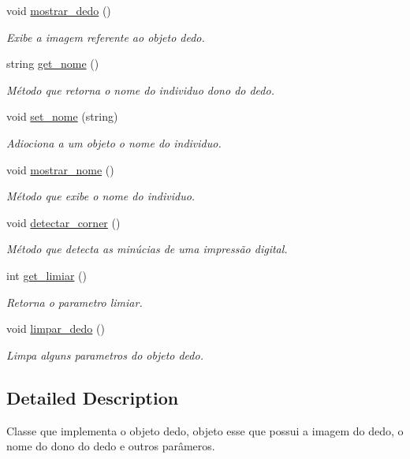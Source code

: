 \begin{DoxyCompactItemize}
void \mbox{\hyperlink{classdedo_acadef8b9556703a74d277907c119b265}{mostrar\+\_\+dedo}} ()
\begin{DoxyCompactList}\small\item\em Exibe a imagem referente ao objeto dedo. \end{DoxyCompactList}\item 
string \mbox{\hyperlink{classdedo_a3703ecb795fd327b28d9fda72de3a702}{get\+\_\+nome}} ()
\begin{DoxyCompactList}\small\item\em Método que retorna o nome do individuo dono do dedo. \end{DoxyCompactList}\item 
void \mbox{\hyperlink{classdedo_a40f9f9b467d878f95691665d8c18d005}{set\+\_\+nome}} (string)
\begin{DoxyCompactList}\small\item\em Adiociona a um objeto o nome do individuo. \end{DoxyCompactList}\item 
void \mbox{\hyperlink{classdedo_a098e4c93dfd50b699abac9a415327f2a}{mostrar\+\_\+nome}} ()
\begin{DoxyCompactList}\small\item\em Método que exibe o nome do individuo. \end{DoxyCompactList}\item 
void \mbox{\hyperlink{classdedo_a4418d126f687ab73c41bb3768f6c0d34}{detectar\+\_\+corner}} ()
\begin{DoxyCompactList}\small\item\em Método que detecta as minúcias de uma impressão digital. \end{DoxyCompactList}\item 
int \mbox{\hyperlink{classdedo_a712670af9bc0a9c755b6f67de9494064}{get\+\_\+limiar}} ()
\begin{DoxyCompactList}\small\item\em Retorna o parametro limiar. \end{DoxyCompactList}\item 
void \mbox{\hyperlink{classdedo_a329de08f6e37adea96e36b9ee2c490de}{limpar\+\_\+dedo}} ()
\begin{DoxyCompactList}\small\item\em Limpa alguns parametros do objeto dedo. \end{DoxyCompactList}\end{DoxyCompactItemize}


\subsection{Detailed Description}
Classe que implementa o objeto dedo, objeto esse que possui a imagem do dedo, o nome do dono do dedo e outros parâmeros. 




